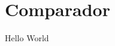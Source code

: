 \documentclass[12pt]{article}
\begin{document}
	\section{Comparador}
	\label{sec:comparador}
	Hello World
\end{document}
